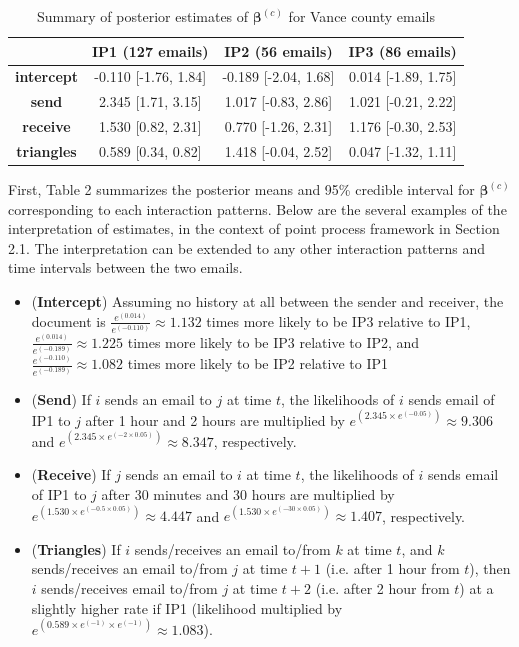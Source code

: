 \documentclass[a4paper]{article}
\begin{document}
\begin{table}[ht]
	\centering
	\begin{tabular}{|c|c|c|c|} 
		\hline
		& \textbf{IP1} (127 emails) & \textbf{IP2} (56 emails) &\textbf{IP3} (86 emails) \\
		\hline
		\textbf{intercept} &-0.110 [-1.76, 1.84]& -0.189 [-2.04, 1.68]& 0.014 [-1.89, 1.75]\\
		\textbf{send}&  2.345 [1.71, 3.15]& 1.017 [-0.83, 2.86]& 1.021 [-0.21, 2.22]\\
		\textbf{receive}& 1.530 [0.82, 2.31]& 0.770 [-1.26, 2.31]& 1.176 [-0.30, 2.53]\\
		\textbf{triangles} & 0.589 [0.34, 0.82]& 1.418 [-0.04, 2.52]& 0.047 [-1.32, 1.11]\\
			\hline
	\end{tabular}
	\caption {Summary of posterior estimates of $\boldsymbol{\beta}^{(c)}$ for Vance county emails}
	\label{table:Vancebeta}
\end{table}
\newline
\normalsize First, Table 2 summarizes the posterior means and 95\% credible interval for $\boldsymbol{\beta}^{(c)}$ corresponding to each interaction patterns. Below are the several examples of the interpretation of estimates, in the context of point process framework in Section 2.1. The interpretation can be extended to any other interaction patterns and time intervals between the two emails.
\begin{itemize} 
	\item (\textbf{Intercept}) Assuming no history at all between the sender and receiver, the document is $\frac{e^{(0.014)}}{e^{(-0.110)}}\approx 1.132$ times more likely to be IP3 relative to IP1, $\frac{e^{(0.014)}}{e^{(-0.189)}}\approx 1.225$ times more likely to be IP3 relative to IP2, and $\frac{e^{(-0.110)}}{e^{(-0.189)}}\approx 1.082$ times more likely to be IP2 relative to IP1
	\item (\textbf{Send}) If $i$ sends an email to $j$ at time $t$, the likelihoods of $i$ sends email of IP1 to $j$ after 1 hour and 2 hours are multiplied by $e^{(2.345\times e^{(-0.05)})}\approx 9.306$ and $e^{(2.345\times e^{(-2\times 0.05)})}\approx 8.347$, respectively.
\item (\textbf{Receive}) If $j$ sends an email to $i$ at time $t$, the likelihoods of $i$ sends email of IP1 to $j$ after 30 minutes and 30 hours are multiplied by $e^{(1.530\times e^{(-0.5\times 0.05)})}\approx 4.447$ and $e^{(1.530\times e^{(-30\times 0.05)})}\approx 1.407$, respectively.
	\item (\textbf{Triangles}) If $i$ sends/receives an email to/from $k$ at time $t$, and $k$ sends/receives an email to/from $j$ at time $t+1$ (i.e. after 1 hour from $t$), then $i$ sends/receives email to/from $j$ at time $t+2$ (i.e. after 2 hour from $t$) at a slightly higher rate if IP1 (likelihood multiplied by $e^{(0.589\times e^{(-1)}\times e^{(-1)})}\approx 1.083$).
\end{itemize}
\end{document}
